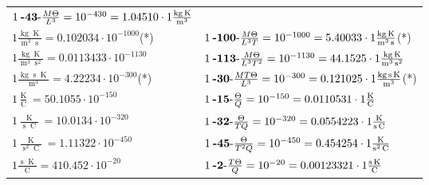 \begin{center}
\begin{longtable}{l l}
	{\color{black}$1\:\text{\textbf{-43}-} \frac{M\Theta}{L^3}=10^{-430} = 1.04510 \cdot 1 \bm{\mathrm{ }}\frac{\operatorname{kg}\operatorname{K}}{\operatorname{m}^3}$}\\
{\color{black}$1 \bm{\mathrm{ }}\frac{\operatorname{kg}\operatorname{K}}{\operatorname{m}^3\operatorname{s}} = 0.102034\cdot10^{-1000} $}\quad(*)&
	{\color{black}$1\:\text{\textbf{-100}-} \frac{M\Theta}{L^3T}=10^{-1000} = 5.40033 \cdot 1 \bm{\mathrm{ }}\frac{\operatorname{kg}\operatorname{K}}{\operatorname{m}^3\operatorname{s}}$}\quad(*)\\
{\color{black}$1 \bm{\mathrm{ }}\frac{\operatorname{kg}\operatorname{K}}{\operatorname{m}^3\operatorname{s}^2} = 0.0113433\cdot10^{-1130} $}&
	{\color{black}$1\:\text{\textbf{-113}-} \frac{M\Theta}{L^3T^2}=10^{-1130} = 44.1525 \cdot 1 \bm{\mathrm{ }}\frac{\operatorname{kg}\operatorname{K}}{\operatorname{m}^3\operatorname{s}^2}$}\\
{\color{black}$1 \bm{\mathrm{ }}\frac{\operatorname{kg}\operatorname{s}\operatorname{K}}{\operatorname{m}^3} = 4.22234\cdot10^{-300} $}\quad(*)&
	{\color{black}$1\:\text{\textbf{-30}-} \frac{MT\Theta}{L^3}=10^{-300} = 0.121025 \cdot 1 \bm{\mathrm{ }}\frac{\operatorname{kg}\operatorname{s}\operatorname{K}}{\operatorname{m}^3}$}\quad(*)\\
\hline{\color{black}$1 \bm{\mathrm{ }}\frac{\operatorname{K}}{\operatorname{C}} = 50.1055\cdot10^{-150} $}&
	{\color{black}$1\:\text{\textbf{-15}-} \frac{\Theta}{Q}=10^{-150} = 0.0110531 \cdot 1 \bm{\mathrm{ }}\frac{\operatorname{K}}{\operatorname{C}}$}\\
{\color{black}$1 \bm{\mathrm{ }}\frac{\operatorname{K}}{\operatorname{s}\operatorname{C}} = 10.0134\cdot10^{-320} $}&
	{\color{black}$1\:\text{\textbf{-32}-} \frac{\Theta}{TQ}=10^{-320} = 0.0554223 \cdot 1 \bm{\mathrm{ }}\frac{\operatorname{K}}{\operatorname{s}\operatorname{C}}$}\\
{\color{black}$1 \bm{\mathrm{ }}\frac{\operatorname{K}}{\operatorname{s}^2\operatorname{C}} = 1.11322\cdot10^{-450} $}&
	{\color{black}$1\:\text{\textbf{-45}-} \frac{\Theta}{T^2Q}=10^{-450} = 0.454254 \cdot 1 \bm{\mathrm{ }}\frac{\operatorname{K}}{\operatorname{s}^2\operatorname{C}}$}\\
{\color{black}$1 \bm{\mathrm{ }}\frac{\operatorname{s}\operatorname{K}}{\operatorname{C}} = 410.452\cdot10^{-20} $}&
	{\color{black}$1\:\text{\textbf{-2}-} \frac{T\Theta}{Q}=10^{-20} = 0.00123321 \cdot 1 \bm{\mathrm{ }}\frac{\operatorname{s}\operatorname{K}}{\operatorname{C}}$}\\

\end{longtable}
\end{center}
